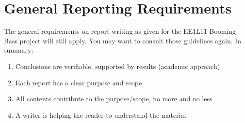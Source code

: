 \chapter{General Reporting Requirements}

  

The general requirements on report writing as given for the EE1L11 Booming Bass project will still apply. You may want to consult those guidelines again. In summary:

\begin{enumerate}
\item  Conclusions are verifiable, supported by results (academic approach)

\item  Each report has a clear purpose and scope

\item  All contents contribute to the purpose/scope, no more and no less

\item  A writer is helping the reader to understand the material
\end{enumerate}


  


